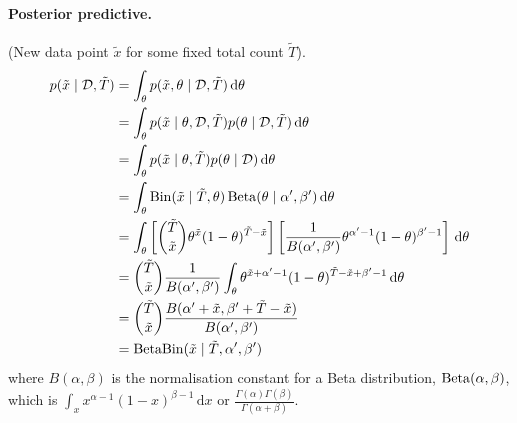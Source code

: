 \paragraph{Posterior predictive.} (New data point $\tilde x$ for some fixed total count $\tilde T$).
    \begin{align*}
        p(\tilde x \mid \mathcal D, \tilde T)   &= \int_{\theta} p(\tilde x, \theta \mid \mathcal D, \tilde T) \,\mathrm d\theta \\
                                                &= \int_{\theta} p(\tilde x \mid \theta, \mathcal D, \tilde T) p(\theta \mid \mathcal D, \tilde T) \,\mathrm d\theta \\
                                                &= \int_{\theta} p(\tilde x \mid \theta, \tilde T) p(\theta \mid \mathcal D) \,\mathrm d\theta \\
                                                &= \int_{\theta} \operatorname{Bin}(\tilde x \mid \tilde T, \theta) \operatorname{Beta}(\theta \mid \alpha', \beta') \,\mathrm d\theta \\
                                                &= \int_{\theta} \left[\binom{\tilde T}{\tilde x} \theta^{\tilde x} (1 - \theta)^{\tilde T - \tilde x}\right] \left[\frac{1}{B(\alpha', \beta')} \theta^{\alpha' - 1} (1 - \theta)^{\beta' - 1}\right] \,\mathrm d\theta \\
                                                &= \binom{\tilde T}{\tilde x} \frac{1}{B(\alpha', \beta')} \int_{\theta} \theta^{\tilde x + \alpha' - 1} (1 - \theta)^{\tilde T - \tilde x + \beta' - 1} \,\mathrm d\theta \\
                                                &= \binom{\tilde T}{\tilde x} \frac{B(\alpha' + \tilde x, \beta' + \tilde T - \tilde x)}{B(\alpha', \beta')} \\
                                                &= \operatorname{BetaBin}(\tilde x \mid \tilde T, \alpha', \beta')
    \end{align*}
where $B(\alpha, \beta)$ is the normalisation constant for a Beta distribution, $\operatorname{Beta}(\alpha, \beta)$, which is $\int_x x^{\alpha - 1} (1 - x)^{\beta - 1} \,\mathrm dx$ or $\frac{\Gamma(\alpha)\Gamma(\beta)}{\Gamma(\alpha + \beta)}$.